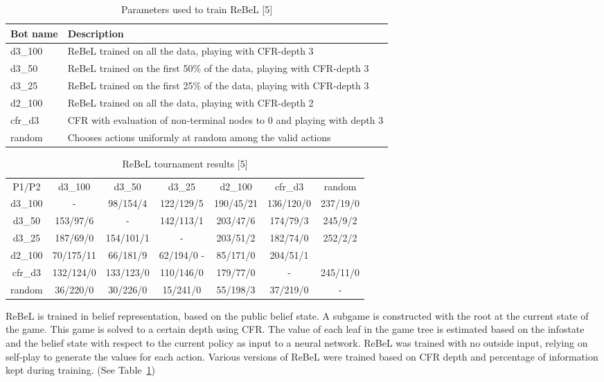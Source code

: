 \documentclass{article}
\begin{document}
\begin{table}
  \caption{Parameters used to train ReBeL [5]}
  \label{rebel-train}
  \centering
  \begin{tabular}{ll}
    \toprule
    Bot name	& Description \\ \midrule
    d3\_100	& ReBeL trained on all the data, playing with CFR-depth 3 \\
    d3\_50	& ReBeL trained on the first 50\% of the data, playing with CFR-depth 3 \\
    d3\_25 	& ReBeL trained on the first 25\% of the data, playing with CFR-depth 3 \\
    d2\_100 	& ReBeL trained on all the data, playing with CFR-depth 2 \\
    cfr\_d3 	& CFR with evaluation of non-terminal nodes to 0 and playing with depth 3 \\
    random 	& Chooses actions uniformly at random among the valid actions \\
    \bottomrule
  \end{tabular}
\end{table}

\begin{table}
  \caption{ReBeL tournament results [5]}
  \label{rebel-results}
  \centering
  \begin{tabular}{ccccccc}
    \toprule
    P1/P2 & d3\_100 & d3\_50 & d3\_25 & d2\_100 & cfr\_d3 & random \\
d3\_100 & - & 98/154/4 & 122/129/5 & 190/45/21 & 136/120/0 & 237/19/0 \\
d3\_50 & 153/97/6 & - & 142/113/1 & 203/47/6 & 174/79/3 & 245/9/2 \\
d3\_25 & 187/69/0 & 154/101/1 & - & 203/51/2 & 182/74/0 & 252/2/2 \\
d2\_100 & 70/175/11 & 66/181/9 & 62/194/0 - & 85/171/0 & 204/51/1 \\
cfr\_d3 & 132/124/0 & 133/123/0 & 110/146/0 & 179/77/0 & - & 245/11/0 \\
random & 36/220/0 & 30/226/0 & 15/241/0 & 55/198/3 & 37/219/0 & - \\
    \bottomrule
  \end{tabular}
\end{table}

ReBeL is trained in belief representation, based on the public belief state. A subgame is constructed with the root at the current state of the game. This game is solved to a certain depth using CFR. 
The value of each leaf in the game tree is estimated based on the infostate and the belief state with respect to the current policy as input to a neural network.  
ReBeL was trained with no outside input, relying on self-play to generate the values for each action. 
Various versions of ReBeL were trained based on CFR depth and percentage of information kept during training. (See Table~\ref{rebel-train})
\end{document}
